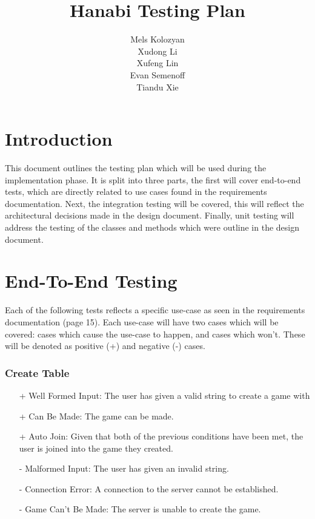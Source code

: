 \documentclass[12pt]{article}
\title{\textbf{Hanabi Testing Plan}}
\author{Mels Kolozyan\\
		Xudong Li\\
		Xufeng Lin\\
		Evan Semenoff\\
		Tiandu Xie\\
		}
\date{}
\begin{document}
\maketitle
\newpage	
{}

\newpage

\part{Introduction}

This document outlines the testing plan which will be used during the implementation
phase.  It is split into three parts, the first will cover end-to-end tests, which are
directly related to use cases found in the requirements documentation.  Next, the
integration testing will be covered, this will reflect the architectural decisions made
in the design document.  Finally, unit testing will address the testing of the classes
and methods which were outline in the design document.

\part{End-To-End Testing}

Each of the following tests reflects a specific use-case as seen in the requirements
documentation (page 15).  Each use-case will have two cases which will be covered: cases
which cause the use-case to happen, and cases which won't.  These will be denoted as positive
(+) and negative (-) cases.

\section{Create Table}

\begin{itemize}

\item[+] Well Formed Input: The user has given a valid string to create a game with
\item[+] Can Be Made: The game can be made.
\item[+] Auto Join: Given that both of the previous conditions have been met, the
user is joined into the game they created.

\item[-] Malformed Input: The user has given an invalid string.
\item[-] Connection Error: A connection to the server cannot be established.
\item[-] Game Can't Be Made: The server is unable to create the game.

\end{itemize}
\end{document}
